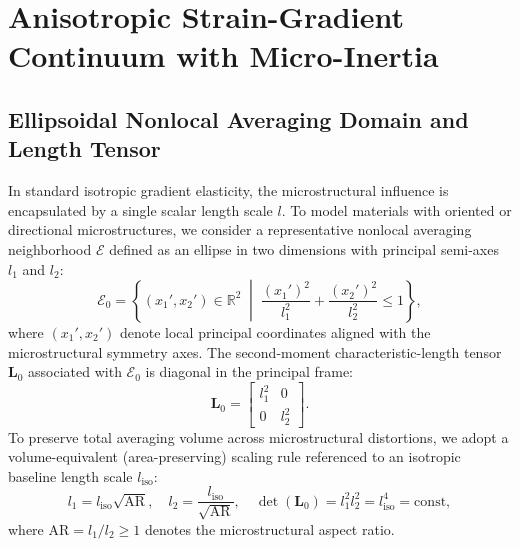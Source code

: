 \section{Anisotropic Strain-Gradient Continuum with Micro-Inertia}
\label{sec:continuum}

\subsection{Ellipsoidal Nonlocal Averaging Domain and Length Tensor}
In standard isotropic gradient elasticity, the microstructural influence is encapsulated by a single scalar length scale $l$. To model materials with oriented or directional microstructures, we consider a representative nonlocal averaging neighborhood $\mathcal{E}$ defined as an ellipse in two dimensions with principal semi-axes $l_1$ and $l_2$:
\begin{equation}
\mathcal{E}_0 = \left\{ (x_1', x_2') \in \mathbb{R}^2 \;\middle|\; \frac{(x_1')^2}{l_1^2} + \frac{(x_2')^2}{l_2^2} \le 1 \right\},
\label{eq:ellipse_def}
\end{equation}
where $(x_1', x_2')$ denote local principal coordinates aligned with the microstructural symmetry axes. The second-moment characteristic-length tensor $\mathbf{L}_0$ associated with $\mathcal{E}_0$ is diagonal in the principal frame:
\begin{equation}
\mathbf{L}_0 = \begin{bmatrix} l_1^2 & 0 \\ 0 & l_2^2 \end{bmatrix}.
\label{eq:L0_mat}
\end{equation}
To preserve total averaging volume across microstructural distortions, we adopt a volume-equivalent (area-preserving) scaling rule referenced to an isotropic baseline length scale $l_{\mathrm{iso}}$:
\begin{equation}
l_1 = l_{\mathrm{iso}}\sqrt{\mathrm{AR}}, \quad l_2 = \frac{l_{\mathrm{iso}}}{\sqrt{\mathrm{AR}}}, \quad \det(\mathbf{L}_0) = l_1^2 l_2^2 = l_{\mathrm{iso}}^4 = \mathrm{const},
\label{eq:volume_equivalent}
\end{equation}
where $\mathrm{AR} = l_1/l_2 \ge 1$ denotes the microstructural aspect ratio.

